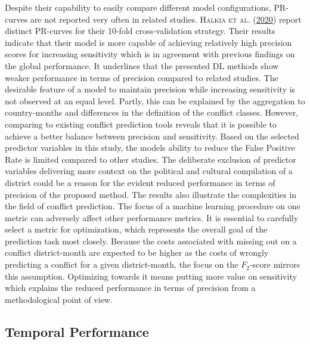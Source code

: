\documentclass[a4paper,11pt]{article}
\begin{document}
Despite their capability to easily compare different model configurations, PR-curves
are not reported very often in related studies. \textsc{\textnormal{Halkia} \textnormal{et al.}} \textsc{(\textnormal{\protect\hyperlink{ref-halkia2020a}{2020}})} report distinct
PR-curves for their 10-fold cross-validation strategy. Their results indicate
that their model is more capable of achieving relatively high precision scores for
increasing sensitivity which is in agreement with previous findings on the global
performance. It underlines that the presented DL methods show weaker performance
in terms of precision compared to related studies. The desirable feature of a
model to maintain precision while increasing sensitivity is not observed at an
equal level. Partly, this can be explained by the aggregation to country-months
and differences in the definition of the conflict classes. However, comparing to
existing conflict prediction tools reveals that it is possible to achieve a better
balance between precision and sensitivity. Based on the selected predictor
variables in this study, the models ability to reduce the False Positive Rate
is limited compared to other studies. The deliberate exclusion of predictor
variables delivering more context on the political and cultural compilation of a
district could be a reason for the evident reduced performance in terms of precision
of the proposed method.
The results also illustrate the complexities in the field of conflict prediction.
The focus of a machine learning procedure on one metric can adversely affect other
performance metrics. It is essential to carefully select a metric for optimization,
which represents the overall goal of the prediction task most closely. Because
the costs associated with missing out on a conflict district-month are expected
to be higher as the costs of wrongly predicting a conflict for a given district-month,
the focus on the \(F_2\)-score mirrors this assumption. Optimizing towards it means
putting more value on sensitivity which explains the reduced performance in terms
of precision from a methodological point of view.

\hypertarget{temporal-performance}{%
\subsection{Temporal Performance}\label{temporal-performance}}
\end{document}
